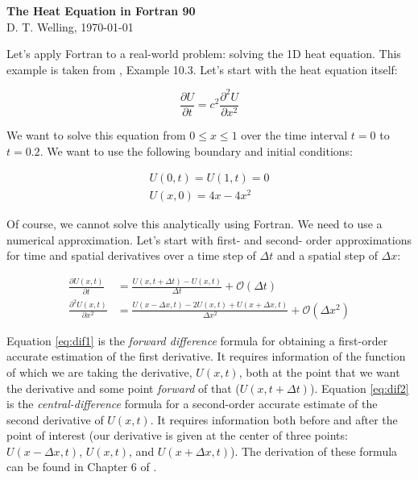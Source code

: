 \documentclass[11pt, letterpaper]{article}
\begin{document}
\setlength{\pdfpageheight}{\paperheight}
\setlength{\pdfpagewidth}{\paperwidth}

\begin{center}
  {\LARGE \textbf{The Heat Equation in Fortran 90}\\}
  {\large D. T. Welling, \today}
\end{center}

Let's apply Fortran to a real-world problem: solving the 1D heat equation.
This example is taken from \citet{Mathews2004}, Example 10.3.  Let's start
with the heat equation itself:

\begin{equation}
  \label{eq:heat}
  \frac{\partial U}{\partial t} = c^2 \frac{\partial^2 U}{\partial x^2}
\end{equation}

We want to solve this equation from $0 \leq x \leq 1$ over the time
interval $t=0$ to $t=0.2$.  We want to use the following boundary
and initial conditions:

\begin{gather}
  \label{eq:boundx}
  U(0,t) = U(1, t) = 0 \\
  \label{eq:boundt}
  U(x,0) = 4x - 4x^2
\end{gather}

Of course, we cannot solve this analytically using Fortran.  We need to use
a numerical approximation.  Let's start with first- and second- order
approximations for time and spatial derivatives over a time step of
$\Delta t$ and a spatial step of $\Delta x$:

\begin{align}
  \label{eq:dif1}
  \frac{\partial U(x,t)}{\partial t}&=\frac{U(x, t+\Delta t)-U(x,t)}{\Delta t}
  +\mathcal{O}(\Delta t)\\
  \label{eq:dif2}
  \frac{\partial^2 U(x,t)}{\partial x^2}&=
  \frac{U(x-\Delta x,t)-2U(x,t)+U(x+\Delta x,t)}{\Delta x^2}
  +\mathcal{O}(\Delta x^2)
\end{align}

Equation \ref{eq:dif1} is the \emph{forward difference} formula for
obtaining a first-order accurate estimation of the first derivative.
It requires information of the function of which we are taking the
derivative, $U(x,t)$, both at the point that we want the derivative and
some point \emph{forward} of that ($U(x,t+\Delta t)$).
Equation \ref{eq:dif2} is the \emph{central-difference} formula for
a second-order accurate estimate of
the second derivative of $U(x,t)$.  It requires information both before and
after the point of interest (our derivative is given at the center of
three points: $U(x-\Delta x, t)$, $U(x,t)$, and $U(x+\Delta x, t)$).  The
derivation of these formula can be found in Chapter 6 of \citet{Mathews2004}.
\end{document}
